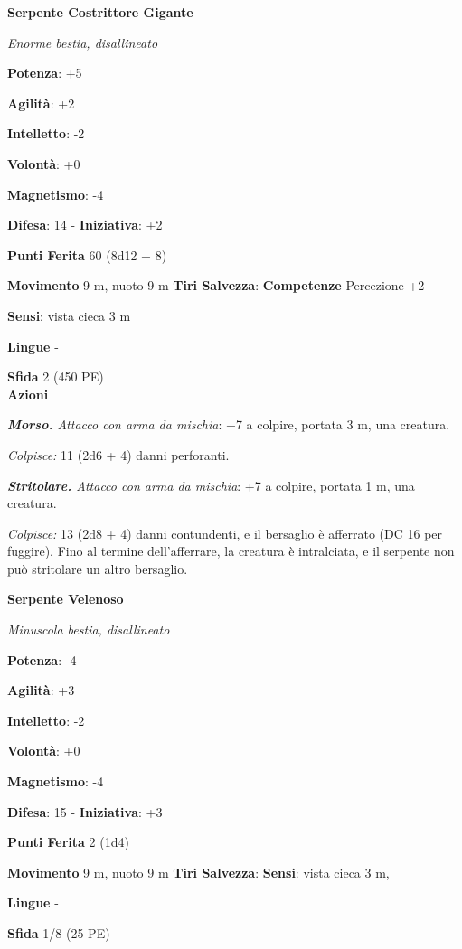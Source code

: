 \begin{multicols}{2}
\textbf{Serpente Costrittore Gigante}

\emph{Enorme bestia, disallineato}

\textbf{Potenza}: +5

\textbf{Agilità}: +2

\textbf{Intelletto}: -2

\textbf{Volontà}: +0

\textbf{Magnetismo}: -4

\textbf{Difesa}: 14 - \textbf{Iniziativa}: +2

\textbf{Punti Ferita} 60 (8d12 + 8)

\textbf{Movimento} 9 m, nuoto 9 m
\textbf{Tiri Salvezza}:
\textbf{Competenze} Percezione +2

\textbf{Sensi}: vista cieca 3 m

\textbf{Lingue} -

\textbf{Sfida} 2 (450 PE)\smallskip\\

\smallskip\textbf{Azioni}

\emph{\textbf{Morso.} Attacco con arma da mischia}: +7 a colpire,
portata 3 m, una creatura.

\emph{Colpisce:} 11 (2d6 + 4) danni perforanti.

\emph{\textbf{Stritolare.} Attacco con arma da mischia}: +7 a colpire,
portata 1 m, una creatura.

\emph{Colpisce:} 13 (2d8 + 4) danni contundenti, e il bersaglio è
afferrato (DC 16 per fuggire). Fino al termine dell'afferrare, la
creatura è intralciata, e il serpente non può stritolare un altro
bersaglio.



\textbf{Serpente Velenoso}

\emph{Minuscola bestia, disallineato}

\textbf{Potenza}: -4

\textbf{Agilità}: +3

\textbf{Intelletto}: -2

\textbf{Volontà}: +0

\textbf{Magnetismo}: -4

\textbf{Difesa}: 15 - \textbf{Iniziativa}: +3

\textbf{Punti Ferita} 2 (1d4)

\textbf{Movimento} 9 m, nuoto 9 m
\textbf{Tiri Salvezza}:
\textbf{Sensi}: vista cieca 3 m, 

\textbf{Lingue} -

\textbf{Sfida} 1/8 (25 PE)\smallskip\\


\end{multicols}
